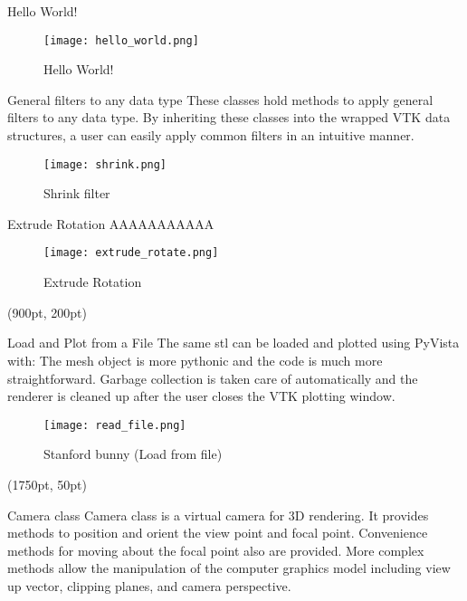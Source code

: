 \documentclass[final]{beamer}
\begin{document}
\begin{frame}[fragile]
\begin{textblock*}{800pt}
\begin{block}{Hello World!}

\begin{figure}
\texttt{[image: hello\_world.png]}
\caption{Hello World!}\label{HelloWorldFigure}
\end{figure}
\end{block}
\begin{block}{General filters to any data type}
These classes hold methods to apply general filters to any data type.
By inheriting these classes into the wrapped VTK data structures, a user can easily apply common filters in an intuitive manner.

\begin{figure}
\texttt{[image: shrink.png]}
\caption{Shrink filter}
\end{figure}
\end{block}
\begin{block}{Extrude Rotation}
AAAAAAAAAAA

\begin{figure}
\texttt{[image: extrude\_rotate.png]}
\caption{Extrude Rotation}
\end{figure}
\end{block}
\end{textblock*}

\begin{textblock*}{800pt}(900pt, 200pt)
\begin{block}{Load and Plot from a File}
The same stl can be loaded and plotted using PyVista with:
The mesh object is more pythonic and the code is much more straightforward.
Garbage collection is taken care of automatically and the renderer is cleaned up after the user closes the VTK plotting window.

\begin{figure}
\texttt{[image: read\_file.png]}
\caption{Stanford bunny (Load from file)}
\end{figure}
\end{block}
\end{textblock*}

\begin{textblock*}{800pt}(1750pt, 50pt)
\begin{block}{Camera class}
Camera class is a virtual camera for 3D rendering.
It provides methods to position and orient the view point and focal point.
Convenience methods for moving about the focal point also are provided.
More complex methods allow the manipulation of the computer graphics model including view up vector, clipping planes, and camera perspective.


\end{block}
\end{textblock*}
\end{frame}
\end{document}
